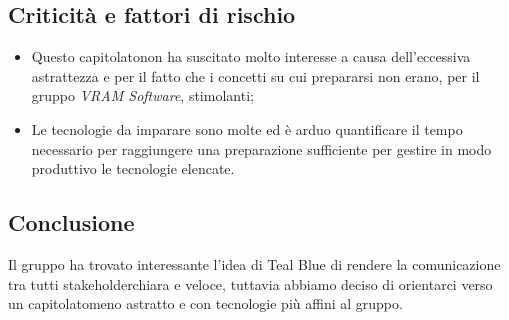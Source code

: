 \subsection{Criticità e fattori di rischio}
\begin{itemize}
	\item Questo capitolato\glosp non ha suscitato molto interesse a causa dell'eccessiva astrattezza e per il fatto che i concetti su cui prepararsi non erano, per il gruppo \textit{VRAM Software}, stimolanti;
	\item Le tecnologie da imparare sono molte ed è arduo quantificare il tempo necessario per raggiungere una preparazione sufficiente per gestire in modo produttivo le tecnologie elencate.
\end{itemize}
\subsection{Conclusione}
Il gruppo ha trovato interessante l'idea di Teal Blue di rendere la comunicazione tra tutti stakeholder\glosp chiara e veloce, tuttavia abbiamo deciso di orientarci verso un capitolato\glosp meno astratto e con tecnologie più affini al gruppo.
